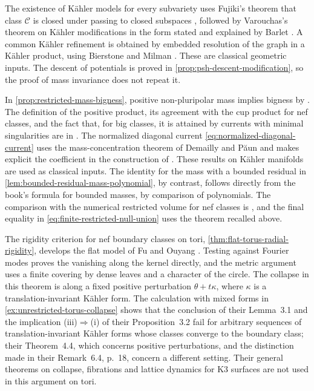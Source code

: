 The existence of K\"ahler models for every subvariety uses Fujiki's theorem that class $\mathcal C$ is closed under passing to closed subspaces \cite[Lemma~4.6(2), p.~35]{Fujiki78}, followed by Varouchas's theorem on K\"ahler modifications in the form stated and explained by Barlet \cite[Theorem 10, pp.~31--32]{Barlet00}. A common K\"ahler refinement is obtained by embedded resolution of the graph in a K\"ahler product, using Bierstone and Milman \cite[Theorem~1.6 and Remarks~1.7(2), pp.~215--216]{BM97}. These are classical geometric inputs. The descent of potentials is proved in \cref{prop:psh-descent-modification}, so the proof of mass invariance does not repeat it.

In \cref{prop:restricted-mass-bigness}, positive non-pluripolar mass implies bigness by \cite[Proposition~1.22, p.~222]{BEGZ10}. The definition of the positive product, its agreement with the cup product for nef classes, and the fact that, for big classes, it is attained by currents with minimal singularities are in \cite[Definition~1.17, pp.~218--219, and Proposition~1.20, pp.~221--222]{BEGZ10}. The normalized diagonal current \eqref{eq:normalized-diagonal-current} uses the mass-concentration theorem of Demailly and P{\u a}un \cite[Proposition 2.6]{DP04} and makes explicit the coefficient in the construction of \cite[Theorem 2.12]{DP04}. These results on K\"ahler manifolds are used as classical inputs. The identity for the mass with a bounded residual in \cref{lem:bounded-residual-mass-polynomial}, by contrast, follows directly from the book's formula for bounded masses, by comparison of polynomials. The comparison with the numerical restricted volume for nef classes is \cite[Lemma 2.6]{CT22Restricted}, and the final equality in \eqref{eq:finite-restricted-null-union} uses the theorem \cite[Theorem 1.1]{CT15Loci} recalled above.

The rigidity criterion for nef boundary classes on tori, \cref{thm:flat-torus-radial-rigidity}, develops the flat model of Fu and Ouyang \cite[v1, Section~3, pp.~5--6]{FuOuyang26}. Testing against Fourier modes proves the vanishing along the kernel directly, and the metric argument uses a finite covering by dense leaves and a character of the circle. The collapse in this theorem is along a fixed positive perturbation $\theta+t\kappa$, where $\kappa$ is a translation-invariant K\"ahler form. The calculation with mixed forms in \cref{ex:unrestricted-torus-collapse} shows that the conclusion of their Lemma~3.1 and the implication (iii)$\Rightarrow$(i) of their Proposition~3.2 fail for arbitrary sequences of translation-invariant K\"ahler forms whose classes converge to the boundary class; their Theorem~4.4, which concerns positive perturbations, and the distinction made in their Remark~6.4, p.~18, concern a different setting. Their general theorems on collapse, fibrations and lattice dynamics for K3 surfaces are not used in this argument on tori.

